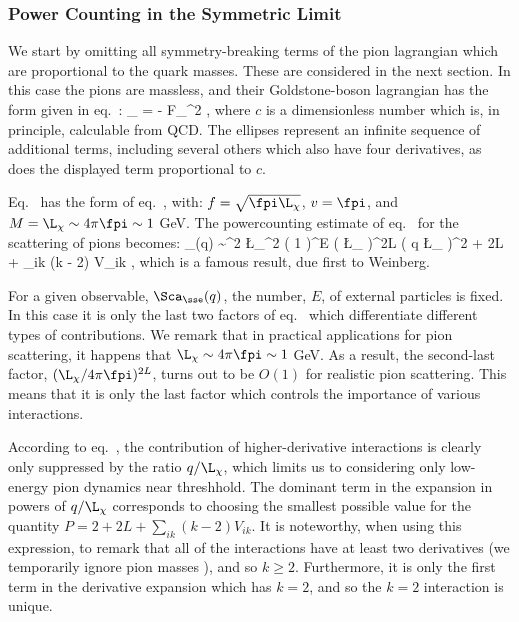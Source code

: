 \documentclass[12pt]{report}
\begin{document}
\subsubsection{Power Counting in the Symmetric Limit}

We start by omitting all symmetry-breaking terms of the
pion lagrangian which are proportional to the quark masses.
These are considered in the next section. In this case the
pions are massless, and their Goldstone-boson lagrangian
has the form given in 
eq.~: 
%
\eq
\label{chiPT}
\Scl_{\pi \pi} = - {F_\pi^2 } \;
, \eeq
%
where $c$ is a dimensionless number which is, in principle,
calculable from QCD. The ellipses represent an infinite
sequence of additional terms, including several others
which also have four derivatives, as does the displayed
term proportional to $c$.

Eq.~ has the form of eq.~, with:  
$f = \sqrt{\fpi \L_\chi}$, $v = \fpi$, and $M = \L_\chi
\sim 4 
\pi \fpi \sim 1$ GeV. The powercounting estimate of 
eq.~ for the scattering of pions becomes:
%
\eq
\label{ChPTpcapp}
\tilde\Sca_\sse(q) \sim \fpi^2 \L_\chi^2 
\; \left( {1 \over \fpi} \right)^E \;
\left( {\L_\chi {} \pi \fpi} \right)^{2L} 
\; \left( {q \over \L_\chi}
\right)^{2 + 2L + \sum_{ik} (k - 2) 
V_{ik}} , \eeq
%
which is a famous result, due first to Weinberg.

For a given observable, $\Sca_\sse(q)$, the number, $E$, of
external particles is fixed. In this case it is only the
last two factors of eq.~ which
differentiate different types of contributions. We remark
that in practical applications for pion scattering, it
happens that  $\L_\chi \sim 4 \pi \fpi \sim 1$ GeV. As a
result, the second-last factor, $(\L_\chi / 4 \pi
\fpi)^{2L}$, turns out to be $O(1)$ for realistic pion
scattering. This means that it is only the last factor
which controls the importance of various interactions.

According to eq.~, the contribution of
higher-derivative interactions is clearly only suppressed
by the ratio 
$q/\L_\chi$, which limits us to considering only low-energy
pion dynamics near threshhold. The dominant term in the
expansion in powers of $q/\L_\chi$ corresponds to choosing
the smallest possible value for the quantity $P = 2 + 2L +
\sum_{ik} (k - 2) V_{ik}$. It is noteworthy, when using
this expression, to remark that all of the interactions
have at least two derivatives (we temporarily ignore 
pion masses \etc),
and so $k \geq 2$. Furthermore, it is only the first term in
the derivative expansion which has $k=2$, and so the $k=2$
interaction is unique. 
\end{document}
